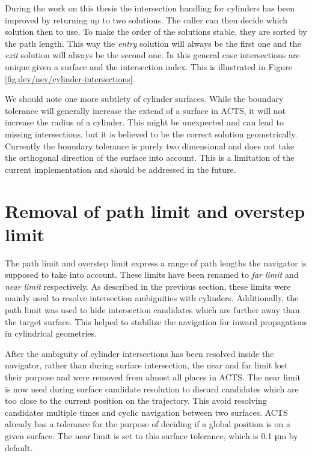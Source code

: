 

During the work on this thesis the intersection handling for cylinders has been improved by returning up to two solutions. The caller can then decide which solution then to use. To make the order of the solutions stable, they are sorted by the path length. This way the \textit{entry} solution will always be the first one and the \textit{exit} solution will always be the second one. In this general case intersections are unique given a surface and the intersection index. This is illustrated in Figure \ref{fig:dev/nev/cylinder-intersections}.

We should note one more subtlety of cylinder surfaces. While the boundary tolerance will generally increase the extend of a surface in ACTS, it will not increase the radius of a cylinder. This might be unexpected and can lead to missing intersections, but it is believed to be the correct solution geometrically. Currently the boundary tolerance is purely two dimensional and does not take the orthogonal direction of the surface into account. This is a limitation of the current implementation and should be addressed in the future.

\section{Removal of path limit and overstep limit}

The path limit and overstep limit express a range of path lengths the navigator is supposed to take into account. These limits have been renamed to \textit{far limit} and \textit{near limit} respectively. As described in the previous section, these limits were mainly used to resolve intersection ambiguities with cylinders. Additionally, the path limit was used to hide intersection candidates which are further away than the target surface. This helped to stabilize the navigation for inward propagations in cylindrical geometries.

After the ambiguity of cylinder intersections has been resolved inside the navigator, rather than during surface intersection, the near and far limit lost their purpose and were removed from almost all places in ACTS. The near limit is now used during surface candidate resolution to discard candidates which are too close to the current position on the trajectory. This avoid resolving candidates multiple times and cyclic navigation between two surfaces. ACTS already has a tolerance for the purpose of deciding if a global position is on a given surface. The near limit is set to this surface tolerance, which is 0.1 μm by default.

